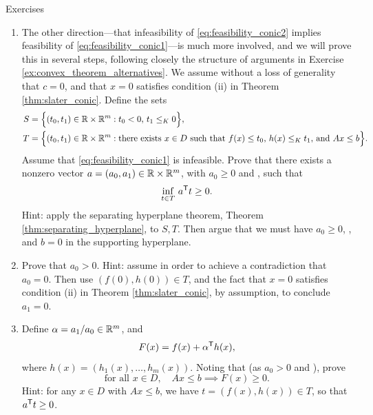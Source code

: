 \begin{xcb}{Exercises}
\begin{enumerate}[label=\thechapter.\arabic*]
\begin{enumerate}[label=\alph*.]
\item The other direction---that infeasibility of \eqref{eq:feasibility_conic2}
  implies feasibility of \eqref{eq:feasibility_conic1}---is much more involved,
  and we will prove this in several steps, following closely the structure of
  arguments in Exercise \ref{ex:convex_theorem_alternatives}. We assume without
  a loss of generality that $c = 0$, and that $x = 0$ satisfies condition (ii)
  in Theorem \ref{thm:slater_conic}. Define the sets         
  \begin{align*}
  S &= \Big\{ (t_0, t_1) \in \mathbb{R} \times \mathbb{R}^m : t_0 < 0, \, t_1 \leq_K 0 \Big\},
    \\    
  T &= \Big\{ (t_0, t_1) \in \mathbb{R} \times \mathbb{R}^m : \text{there exists $x \in D$ such
      that $f(x) \leq t_0$, $h(x) \leq_K t_1$, and $Ax \leq b$} \Big\}.  
  \end{align*}
  Assume that \eqref{eq:feasibility_conic1} is infeasible. Prove that there
  exists a nonzero vector $a = (a_0, a_1) \in \mathbb{R} \times \mathbb{R}^m$, with $a_0 \geq 0$
  and , such that    
  \[
  \inf_{t \in T} \, a^{\mathsf{T}} t \geq 0.  
  \]
  Hint: apply the separating hyperplane theorem, Theorem
  \ref{thm:separating_hyperplane}, to $S,T$. Then argue that we must have $a_0
  \geq 0$, , and $b = 0$ in the supporting hyperplane.    

\item Prove that $a_0 > 0$. Hint: assume in order to achieve a contradiction 
  that $a_0 = 0$. Then use $(f(0), h(0)) \in T$, and the fact that $x = 0$
  satisfies condition (ii) in Theorem \ref{thm:slater_conic}, by assumption,
  to conclude $a_1 = 0$.

\item Define $\alpha = a_1 / a_0 \in \mathbb{R}^m$, and  
  \[
  F(x) = f(x) + \alpha^{\mathsf{T}} h(x),
  \]
  where $h(x) = (h_1(x), \dots, h_m(x))$. Noting that  (as $a_0 > 0$ and ), prove 
  \[
 \text{for all $x \in D$}, \quad Ax \leq b \implies F(x) \geq 0.
  \]
  Hint: for any $x \in D$ with $Ax \leq b$, we have $t = (f(x), h(x)) \in T$, so
  that $a^{\mathsf{T}} t \geq 0$.


\end{enumerate}
\end{enumerate}
\end{xcb}
